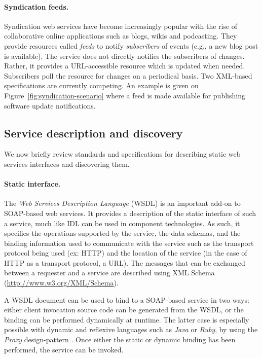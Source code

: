 \paragraph{Syndication feeds.}
Syndication web services have become increasingly popular with the rise of collaborative online applications such as blogs, wikis and podcasting. They provide resources called \emph{feeds} to notify \emph{subscribers} of events (e.g., a new blog post is available). The service does not directly notifies the subscribers of changes. Rather, it provides a URL-accessible resource which is updated when needed. Subscribers poll the resource for changes on a periodical basis. Two XML-based specifications are currently competing. An example is given on Figure~\ref{fig:syndication-scenario} where a feed is made available for publishing software update notifications.


\subsection{Service description and discovery}


We now briefly review standards and specifications for describing static web services interfaces and discovering them.

\paragraph{Static interface.}
The \emph{Web Services Description Language} (WSDL) \cite{ECFC+01} is an important add-on to SOAP-based web services. It provides a description of the static interface of such a service, much like IDL can be used in component technologies. As such, it specifies the operations supported by the service, the data schemas, and the binding information used to communicate with the service such as the transport protocol being used (ex: HTTP) and the location of the service (in the case of HTTP as a transport protocol, a URL). The messages that can be exchanged between a requester and a service are described using XML Schema (\url{http://www.w3.org/XML/Schema}).

A WSDL document can be used to bind to a SOAP-based service in two ways: either client invocation source code can be generated from the WSDL, or the binding can be performed dynamically at runtime. The latter case is especially possible with dynamic and reflexive languages such as \emph{Java} or \emph{Ruby}, by using the \emph{Proxy} design-pattern \cite{Gamma95}. Once either the static or dynamic binding has been performed, the service can be invoked.

